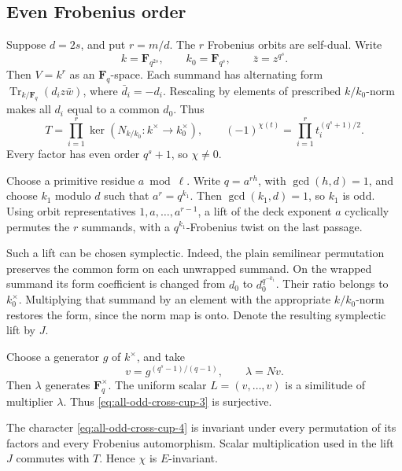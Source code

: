 \subsection{Even Frobenius order}

Suppose \(d=2s\), and put \(r=m/d\).
The \(r\) Frobenius orbits are self-dual.
Write
\[
 k=\mathbf F_{q^{2s}},\qquad k_0=\mathbf F_{q^s},\qquad
 \bar z=z^{q^s}.
\]
Then \(V=k^r\) as an \(\mathbf F_q\)-space.
Each summand has alternating form
\(\operatorname{Tr}_{k/\mathbf F_q}(d_i z\bar w)\),
where \(\bar d_i=-d_i\).
Rescaling by elements of prescribed \(k/k_0\)-norm
makes all \(d_i\) equal to a common \(d_0\).
Thus
\begin{equation}
 T=\prod_{i=1}^r\ker(N_{k/k_0}:k^\times\to k_0^\times),
 \qquad
 (-1)^{\chi(t)}=\prod_{i=1}^r t_i^{(q^s+1)/2}.            \label{eq:all-odd-cross-cup-4}
\end{equation}
Every factor has even order \(q^s+1\), so \(\chi\ne0\).

Choose a primitive residue \(a\bmod\ell\).
Write \(q=a^{rh}\), with \(\gcd(h,d)=1\), and choose
\(k_1\) modulo \(d\) such that \(a^r=q^{k_1}\).
Then \(\gcd(k_1,d)=1\), so \(k_1\) is odd.
Using orbit representatives \(1,a,\ldots,a^{r-1}\),
a lift of the deck exponent \(a\) cyclically permutes
the \(r\) summands, with a \(q^{k_1}\)-Frobenius twist
on the last passage.

Such a lift can be chosen symplectic.
Indeed, the plain semilinear permutation preserves
the common form on each unwrapped summand.
On the wrapped summand its form coefficient is changed
from \(d_0\) to \(d_0^{q^{-k_1}}\).
Their ratio belongs to \(k_0^\times\).
Multiplying that summand by an element with the
appropriate \(k/k_0\)-norm restores the form, since
the norm map is onto. Denote the resulting symplectic
lift by \(J\).

Choose a generator \(g\) of \(k^\times\), and take
\[
 v=g^{(q^s-1)/(q-1)},\qquad \lambda=Nv.
\]
Then \(\lambda\) generates \(\mathbf F_q^\times\).
The uniform scalar \(L=(v,\ldots,v)\) is a similitude
of multiplier \(\lambda\).
Thus \eqref{eq:all-odd-cross-cup-3} is surjective.

The character \eqref{eq:all-odd-cross-cup-4} is invariant under every permutation
of its factors and every Frobenius automorphism.
Scalar multiplication used in the lift \(J\) commutes
with \(T\). Hence \(\chi\) is \(E\)-invariant.

